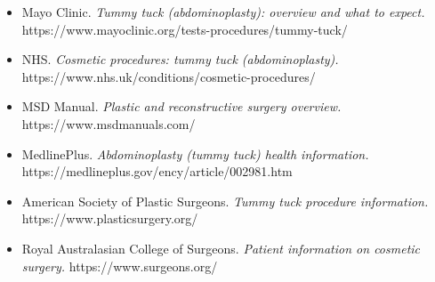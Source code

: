 \begin{itemize}
    \item Mayo Clinic. \textit{Tummy tuck (abdominoplasty): overview and what to expect.} https://www.mayoclinic.org/tests-procedures/tummy-tuck/
    \item NHS. \textit{Cosmetic procedures: tummy tuck (abdominoplasty).} https://www.nhs.uk/conditions/cosmetic-procedures/
    \item MSD Manual. \textit{Plastic and reconstructive surgery overview.} https://www.msdmanuals.com/
    \item MedlinePlus. \textit{Abdominoplasty (tummy tuck) health information.} https://medlineplus.gov/ency/article/002981.htm
    \item American Society of Plastic Surgeons. \textit{Tummy tuck procedure information.} https://www.plasticsurgery.org/
    \item Royal Australasian College of Surgeons. \textit{Patient information on cosmetic surgery.} https://www.surgeons.org/
\end{itemize}
